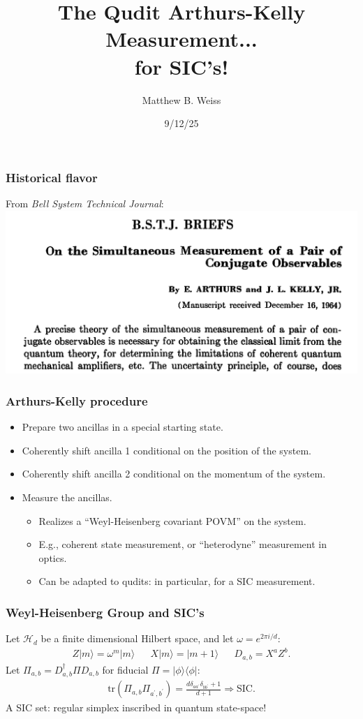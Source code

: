 \documentclass{beamer}
\title{The Qudit Arthurs-Kelly Measurement...\\for SIC's!}
\author{Matthew B. Weiss}
\institute{UMB: QBism Group}
\date{9/12/25}
\newcommand{\tr}{{\text{tr}}}
\begin{document}
\frame{\titlepage}

\begin{frame}
\frametitle{Historical flavor}
From \emph{Bell System Technical Journal}:
\includegraphics[scale=0.5]{img/ak_ref}	
\end{frame}

\begin{frame}
\frametitle{Arthurs-Kelly procedure}
\begin{itemize}
\item Prepare two ancillas in a special starting state.
\item Coherently shift ancilla 1 conditional on the position of the system.
\item Coherently shift ancilla 2 conditional on the momentum of the system.
\item Measure the ancillas.
\begin{itemize}
\item Realizes a ``Weyl-Heisenberg covariant POVM'' on the system.
\item E.g., coherent state measurement, or ``heterodyne'' measurement in optics.
\item Can be adapted to qudits: in particular, for a SIC measurement.
\end{itemize}
\end{itemize}
	
\end{frame}


\begin{frame}
\frametitle{Weyl-Heisenberg Group and SIC's}
Let $\mathcal{H}_d$ be a finite dimensional Hilbert space, and let $\omega = e^{2\pi i /d}$:
\begin{align}
Z|m\rangle = \omega^{m}|m\rangle && 	X|m\rangle = |m+1\rangle && D_{a,b} = X^a Z^b.
\end{align}	
Let $\Pi_{a,b}=D_{a,b}^\dagger \Pi D_{a,b}$ for fiducial $\Pi=|\phi\rangle\langle \phi|$:
\begin{align}
	\tr(\Pi_{a,b}\Pi_{a^\prime,  b^\prime})=\frac{d\delta_{aa^\prime}\delta_{bb^\prime}+1}{d+1} \Longrightarrow \text{SIC}.
\end{align}
A SIC set: regular simplex inscribed in quantum state-space!
\end{frame}
\end{document}
